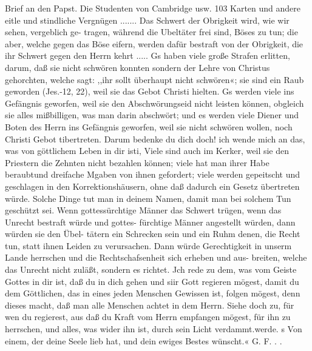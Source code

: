 Brief an den Papst. Die Studenten von Cambridge usw. 103
Karten und andere eitle und stindliche Vergnügen .......
Das Schwert der Obrigkeit wird, wie wir sehen, vergeblich ge-
tragen, während die Ubeltäter frei sind, Böses zu tun; die aber,
welche gegen das Böse eifern, werden dafür bestraft von der
Obrigkeit, die ihr Schwert gegen den Herrn kehrt ..... Gs haben
viele große Strafen erlitten, darum, daß sie nicht schwören konnten
sondern der Lehre von Christus gehorchten, welche sagt: ,,ihr sollt
überhaupt nicht schwören«; sie sind ein Raub geworden (Jes.-12, 22),
weil sie das Gebot Christi hielten. Gs werden viele ins Gefängnis
geworfen, weil sie den Abschwörungseid nicht leisten können, obgleich
sie alles mißbilligen, was man darin abschwört; und es werden
viele Diener und Boten des Herrn ins Gefängnis geworfen, weil sie
nicht schwören wollen, noch Christi Gebot tibertreten. Darum bedenke
du dich doch! ich wende mich an das, was von göttlichem Leben
in dir isti, Viele sind auch im Kerker, weil sie den Priestern die
Zehnten nicht bezahlen können; viele hat man ihrer Habe beraubtund
dreifache Mgaben von ihnen gefordert; viele werden gepeitscht und
geschlagen in den Korrektionshäusern, ohne daß dadurch ein Gesetz
übertreten würde. Solche Dinge tut man in deinem Namen, damit
man bei solchem Tun geschützt sei. Wenn gottessürchtige Männer
das Schwert trügen, wenn das Unrecht bestraft würde und gottes-
fürchtige Männer angestellt würden, dann würden sie den Übel-
tätern ein Schrecken sein und ein Ruhm denen, die Recht tun, statt
ihnen Leiden zu verursachen. Dann würde Gerechtigkeit in unserm
Lande herrschen und die Rechtschafsenheit sich erheben und aus-
breiten, welche das Unrecht nicht zuläßt, sondern es richtet. Jch
rede zu dem, was vom Geiste Gottes in dir ist, daß du in dich
gehen und siir Gott regieren mögest, damit du dem Göttlichen,
das in eines jeden Menschen Gewissen ist, folgen mögest, denn
dieses macht, daß man alle Menschen achtet in dem Herrn. Siehe
doch zu, für wen du regierest, aus daß du Kraft vom Herrn
empfangen mögest, für ihn zu herrschen, und alles, was wider ihn
ist, durch sein Licht verdammt.werde.
s Von einem, der deine Seele lieb hat, und dein ewiges Bestes
wünscht.« G. F. . .


